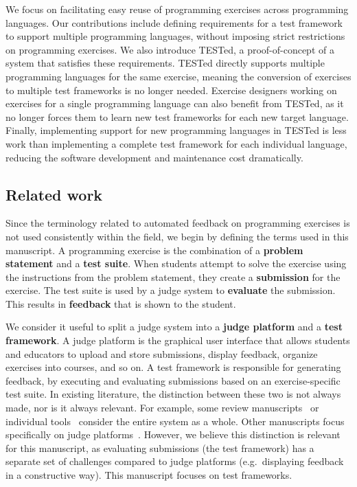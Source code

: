 \documentclass[../main]{subfiles}
\begin{document}
We focus on facilitating easy reuse of programming exercises across programming languages.
Our contributions include defining requirements for a test framework to support multiple programming languages, without imposing strict restrictions on programming exercises.
We also introduce TESTed, a proof-of-concept of a system that satisfies these requirements.
TESTed directly supports multiple programming languages for the same exercise, meaning the conversion of exercises to multiple test frameworks is no longer needed.
Exercise designers working on exercises for a single programming language can also benefit from TESTed, as it no longer forces them to learn new test frameworks for each new target language.
Finally, implementing support for new programming languages in TESTed is less work than implementing a complete test framework for each individual language, reducing the software development and maintenance cost dramatically.

\subsection{Related work}\label{subsec:related-work}

Since the terminology related to automated feedback on programming exercises is not used consistently within the field,
we begin by defining the terms used in this manuscript.
A programming exercise is the combination of a \textbf{problem statement} and a \textbf{test suite}.
When students attempt to solve the exercise using the instructions from the problem statement, they create a \textbf{submission} for the exercise.
The test suite is used by a judge system to \textbf{evaluate} the submission.
This results in \textbf{feedback} that is shown to the student.

We consider it useful to split a judge system into a \textbf{judge platform} and a \textbf{test framework}.
A judge platform is the graphical user interface that allows students and educators to upload and store submissions, display feedback, organize exercises into courses, and so on.
A test framework is responsible for generating feedback, by executing and evaluating submissions based on an exercise-specific test suite.
In existing literature, the distinction between these two is not always made, nor is it always relevant.
For example, some review manuscripts~\autocite{keuning_systematic_2018, wasik_survey_2018} or individual tools~\autocite{bez_uri_2014, petit_jutgeorg_2018} consider the entire system as a whole.
Other manuscripts focus specifically on judge platforms~\autocite{gusukuma_pedal_2020, striewe_architecture_2016}.
However, we believe this distinction is relevant for this manuscript, as evaluating submissions (the test framework) has a separate set of challenges compared to judge platforms (e.g.\ displaying feedback in a constructive way).
This manuscript focuses on test frameworks.
\end{document}
